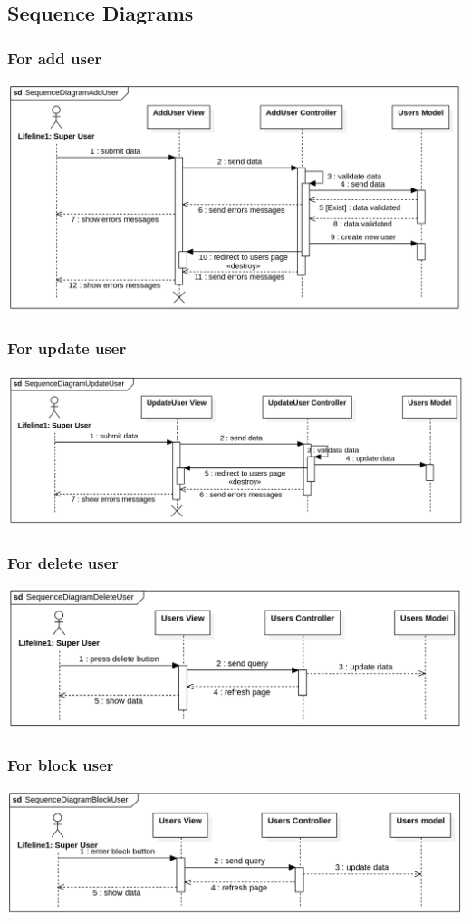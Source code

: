 \documentclass{article}
\begin{document}
	\subsection{Sequence Diagrams}
	\subsubsection{For add user}
	\includegraphics[scale=0.3]{diagrams/add_user_sequence.png}
	\subsubsection{For update user}
	\includegraphics[scale=0.3]{diagrams/update_user_sequence.png}
	\subsubsection{For delete user}
	\includegraphics[scale=0.3]{diagrams/delete_user_sequence.png}
	\subsubsection{For block user}
	\includegraphics[scale=0.3]{diagrams/block_user_sequence.png}
\end{document}
